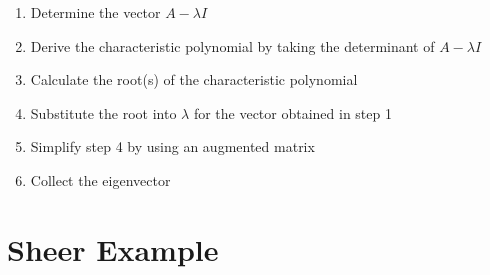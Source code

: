 \documentclass{article}
\begin{document}
	\begin{enumerate}
		\item Determine the vector \(A - \lambda I\)
		\item Derive the characteristic polynomial by taking the determinant of \(A - \lambda I\)
		\item Calculate the root(s) of the characteristic polynomial
		\item Substitute the root into \(\lambda\) for the vector obtained in step 1
		\item Simplify step 4 by using an augmented matrix
		\item Collect the eigenvector
	\end{enumerate}
	
	\newpage
	\section{Sheer Example}
		
\end{document}

